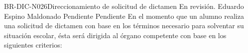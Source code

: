 \begin{BusinessRule}{BR-DIC-N026}{Direccionamiento de solicitud de dictamen}
	{\bcDerivation} %
	{\btEnabler}     %
	{\blControlling}     %
	\BRItem[Estado] En revisión.
	 Eduardo Espino Maldonado
	 Pendiente
	 Pendiente
	\BRItem[Descripción] En el momento que un alumno realiza una solicitud de dictamen con base en los términos necesario para solventar su situación escolar, ésta será dirigida al órgano competente con base en los siguientes criterios: 
	\BRItem[Sentencia] \cdtEmpty
	
%	
	
\end{BusinessRule}

